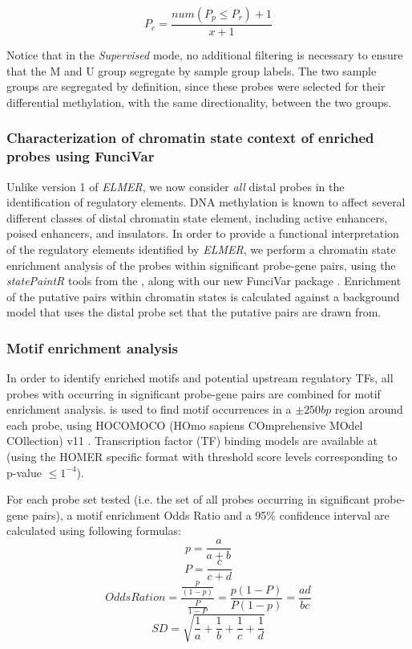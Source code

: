 $$P_e = \frac{num(P_p \leq P_r)+ 1}{x+1}$$

Notice that in the \textit{Supervised} mode, no additional filtering is necessary to ensure that the M and U group segregate by sample group labels.  The two sample groups are segregated by definition, since these probes were selected for their differential methylation, with the same directionality, between the two groups. 



\subsubsection*{Characterization of chromatin state context of enriched probes using FunciVar}

Unlike version 1 of \textit{ELMER}, we now consider \textit{all} distal probes in the identification of regulatory elements. DNA methylation is known to affect several different classes of distal chromatin state element, including active enhancers, poised enhancers, and insulators. In order to provide a functional interpretation of the regulatory elements identified by \textit{ELMER}, we perform a chromatin state enrichment analysis of the probes within significant probe-gene pairs, using the \textit{statePaintR} tools from the  \cite{statepaintr}, along with our new FunciVar package \cite{funcivar}. Enrichment of the putative pairs within chromatin states is calculated against a background model that uses the distal probe set that the putative pairs are drawn from. 

\subsubsection*{Motif enrichment analysis}
In order to identify enriched motifs and potential upstream regulatory TFs, all probes with occurring in significant probe-gene pairs are combined for motif enrichment analysis.  \cite{heinz2010simple} is used to find motif occurrences in a $\pm 250bp$ region around each probe, using HOCOMOCO (HOmo sapiens COmprehensive MOdel COllection) v11 \cite{kulakovskiy2016hocomoco}. Transcription factor (TF) binding models are available at  (using the HOMER specific format with threshold score levels corresponding to p-value $ \leq 1^{-4}$). 

For each probe set tested (i.e. the set of all probes occurring in significant probe-gene pairs), a motif enrichment Odds Ratio and a 95\% confidence interval are calculated using following formulas:
$$p = \frac{a}{a + b}$$
$$P = \frac{c}{c + d}$$
$$Odds Ration = \frac{\frac{p}{(1-p)}}{\frac{P}{1-P}}= \frac{p(1-P)}{P(1-p)}=\frac{ad}{bc}$$
$$SD = \sqrt{\frac{1}{a} + \frac{1}{b} + \frac{1}{c} + \frac{1}{d}}$$

